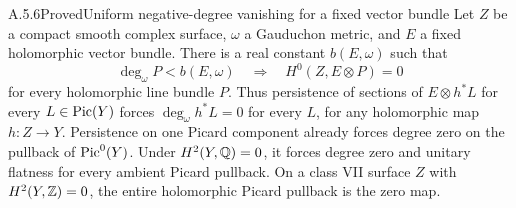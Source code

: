 
\begin{statement}{A.5.6}{Proved}{Uniform negative-degree vanishing for a fixed vector bundle}
Let $Z$ be a compact smooth complex surface, $\omega$ a Gauduchon metric, and $E$ a fixed holomorphic vector bundle. There is a real constant $b(E,\omega)$ such that
\[
 \deg_\omega P<b(E,\omega)
 \quad\Longrightarrow\quad H^0(Z,E\otimes P)=0
 \tag{A.30}
\]
for every holomorphic line bundle $P$. Thus persistence of sections of $E\otimes h^*L$ for every $L\in\operatorname{Pic}(Y)$ forces $\deg_\omega h^*L=0$ for every $L$, for any holomorphic map $h:Z\to Y$. Persistence on one Picard component already forces degree zero on the pullback of $\operatorname{Pic}^0(Y)$. Under $H^2(Y,\mathbb Q)=0$, it forces degree zero and unitary flatness for every ambient Picard pullback. On a class VII surface $Z$ with $H^2(Y,\mathbb Z)=0$, the entire holomorphic Picard pullback is the zero map.
\end{statement}
